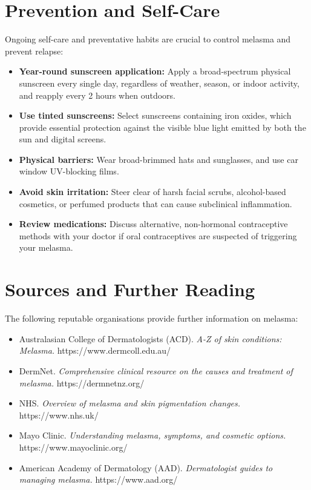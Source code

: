 \section*{Prevention and Self-Care}
Ongoing self-care and preventative habits are crucial to control melasma and prevent relapse:
\begin{itemize}
    \item \textbf{Year-round sunscreen application:} Apply a broad-spectrum physical sunscreen every single day, regardless of weather, season, or indoor activity, and reapply every 2 hours when outdoors.
    \item \textbf{Use tinted sunscreens:} Select sunscreens containing iron oxides, which provide essential protection against the visible blue light emitted by both the sun and digital screens.
    \item \textbf{Physical barriers:} Wear broad-brimmed hats and sunglasses, and use car window UV-blocking films.
    \item \textbf{Avoid skin irritation:} Steer clear of harsh facial scrubs, alcohol-based cosmetics, or perfumed products that can cause subclinical inflammation.
    \item \textbf{Review medications:} Discuss alternative, non-hormonal contraceptive methods with your doctor if oral contraceptives are suspected of triggering your melasma.
\end{itemize}

\section*{Sources and Further Reading}
The following reputable organisations provide further information on melasma:
\begin{itemize}
    \item Australasian College of Dermatologists (ACD). \textit{A-Z of skin conditions: Melasma.} https://www.dermcoll.edu.au/
    \item DermNet. \textit{Comprehensive clinical resource on the causes and treatment of melasma.} https://dermnetnz.org/
    \item NHS. \textit{Overview of melasma and skin pigmentation changes.} https://www.nhs.uk/
    \item Mayo Clinic. \textit{Understanding melasma, symptoms, and cosmetic options.} https://www.mayoclinic.org/
    \item American Academy of Dermatology (AAD). \textit{Dermatologist guides to managing melasma.} https://www.aad.org/
\end{itemize}
